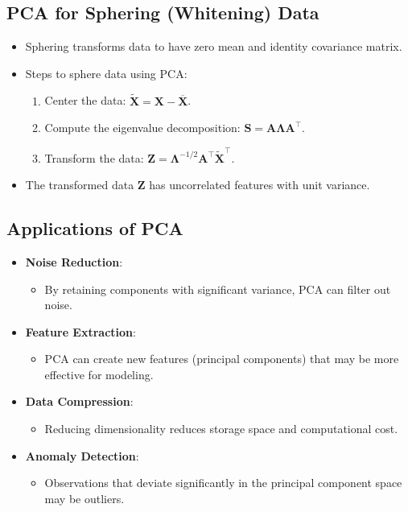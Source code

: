 \documentclass{article}
\begin{document}
\subsection{PCA for Sphering (Whitening) Data}

\begin{itemize}
    \item Sphering transforms data to have zero mean and identity covariance matrix.
    \item Steps to sphere data using PCA:
    \begin{enumerate}
        \item Center the data: $\tilde{\mathbf{X}} = \mathbf{X} - \overline{\mathbf{X}}$.
        \item Compute the eigenvalue decomposition: $\mathbf{S} = \mathbf{A} \mathbf{\Lambda} \mathbf{A}^\top$.
        \item Transform the data: $\mathbf{Z} = \mathbf{\Lambda}^{-1/2} \mathbf{A}^\top \tilde{\mathbf{X}}^\top$.
    \end{enumerate}
    \item The transformed data $\mathbf{Z}$ has uncorrelated features with unit variance.
\end{itemize}

\subsection{Applications of PCA}

\begin{itemize}
    \item \textbf{Noise Reduction}:
    \begin{itemize}
        \item By retaining components with significant variance, PCA can filter out noise.
    \end{itemize}
    \item \textbf{Feature Extraction}:
    \begin{itemize}
        \item PCA can create new features (principal components) that may be more effective for modeling.
    \end{itemize}
    \item \textbf{Data Compression}:
    \begin{itemize}
        \item Reducing dimensionality reduces storage space and computational cost.
    \end{itemize}
    \item \textbf{Anomaly Detection}:
    \begin{itemize}
        \item Observations that deviate significantly in the principal component space may be outliers.
    \end{itemize}
\end{itemize}
\end{document}
